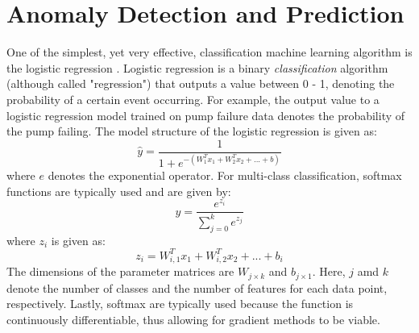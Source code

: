 \section{Anomaly Detection and Prediction}
One of the simplest, yet very effective, classification machine learning algorithm is the logistic regression \cite{log_reg}. Logistic regression is a binary \textit{classification} algorithm (although called "regression") that outputs a value between 0 - 1, denoting the probability of a certain event occurring.  For example, the output value to a logistic regression model trained on pump failure data denotes the probability of the pump failing. The model structure of the logistic regression is given as:
\begin{equation}
    \hat{y} = \frac{1}{1 + e^{-(W_1^Tx_1 + W_2^Tx_2 + ... + b)}}
    \label{eq:02LogS}
\end{equation}
where $e$ denotes the exponential operator.  For multi-class classification, softmax functions are typically used and are given by:
\begin{equation}
    y = \frac{e^{z_i}}{\sum\limits^k_{j=0}e^{z_j}}
    \label{eq:03softmax}
\end{equation}
where $z_i$ is given as:
$$z_i = W_{i, 1}^Tx_1 + W_{i, 2}^Tx_2 + ... + b_i$$
The dimensions of the parameter matrices are $W_{j \times k}$ and $b_{j \times 1}$.  Here, $j$ amd $k$ denote the number of classes and the number of features for each data point, respectively.  Lastly, softmax are typically used because the function is continuously differentiable, thus allowing for gradient methods to be viable.

